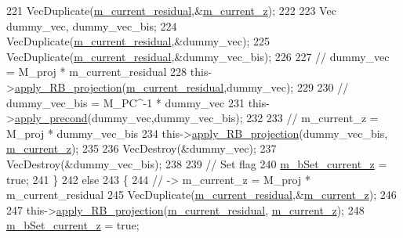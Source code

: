 \begin{DoxyCode}
221             VecDuplicate(\hyperlink{classcarl_1_1_f_e_t_i___operations_a6b1154885f5b8303ecbd32ea76df40e5}{m\_current\_residual},&\hyperlink{classcarl_1_1_f_e_t_i___operations_a56038a186d124078ad4b37c631f50ff0}{m\_current\_z});
222 
223             Vec dummy\_vec, dummy\_vec\_bis;
224             VecDuplicate(\hyperlink{classcarl_1_1_f_e_t_i___operations_a6b1154885f5b8303ecbd32ea76df40e5}{m\_current\_residual},&dummy\_vec);
225             VecDuplicate(\hyperlink{classcarl_1_1_f_e_t_i___operations_a6b1154885f5b8303ecbd32ea76df40e5}{m\_current\_residual},&dummy\_vec\_bis);
226 
227             \textcolor{comment}{// dummy\_vec = M\_proj * m\_current\_residual}
228             this->\hyperlink{classcarl_1_1_f_e_t_i___operations_a51d2927ec333ba1f3b3587ab5952d19e}{apply\_RB\_projection}(\hyperlink{classcarl_1_1_f_e_t_i___operations_a6b1154885f5b8303ecbd32ea76df40e5}{m\_current\_residual},dummy\_vec);
229 
230             \textcolor{comment}{// dummy\_vec\_bis =  M\_PC^-1 * dummy\_vec}
231             this->\hyperlink{classcarl_1_1_f_e_t_i___operations_a90afb4eadbe2b2dcaf997586874a4a17}{apply\_precond}(dummy\_vec,dummy\_vec\_bis);
232 
233             \textcolor{comment}{// m\_current\_z = M\_proj * dummy\_vec\_bis}
234             this->\hyperlink{classcarl_1_1_f_e_t_i___operations_a51d2927ec333ba1f3b3587ab5952d19e}{apply\_RB\_projection}(dummy\_vec\_bis,
      \hyperlink{classcarl_1_1_f_e_t_i___operations_a56038a186d124078ad4b37c631f50ff0}{m\_current\_z});
235 
236             VecDestroy(&dummy\_vec);
237             VecDestroy(&dummy\_vec\_bis);
238 
239             \textcolor{comment}{// Set flag}
240             \hyperlink{classcarl_1_1_f_e_t_i___operations_a979d0cf4b56999fcd126825b60ec192f}{m\_bSet\_current\_z} = \textcolor{keyword}{true};
241         \}
242         \textcolor{keywordflow}{else}
243         \{
244             \textcolor{comment}{// -> m\_current\_z = M\_proj * m\_current\_residual}
245             VecDuplicate(\hyperlink{classcarl_1_1_f_e_t_i___operations_a6b1154885f5b8303ecbd32ea76df40e5}{m\_current\_residual},&\hyperlink{classcarl_1_1_f_e_t_i___operations_a56038a186d124078ad4b37c631f50ff0}{m\_current\_z});
246 
247             this->\hyperlink{classcarl_1_1_f_e_t_i___operations_a51d2927ec333ba1f3b3587ab5952d19e}{apply\_RB\_projection}(\hyperlink{classcarl_1_1_f_e_t_i___operations_a6b1154885f5b8303ecbd32ea76df40e5}{m\_current\_residual},
      \hyperlink{classcarl_1_1_f_e_t_i___operations_a56038a186d124078ad4b37c631f50ff0}{m\_current\_z});
248             \hyperlink{classcarl_1_1_f_e_t_i___operations_a979d0cf4b56999fcd126825b60ec192f}{m\_bSet\_current\_z} = \textcolor{keyword}{true};

\end{DoxyCode}
